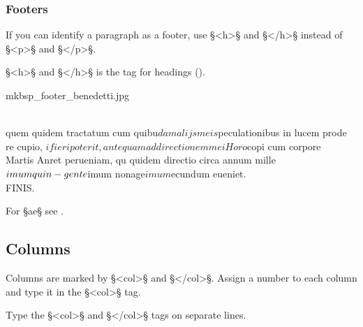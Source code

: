 \subsubsection{Footers}

\begin{mainruleLessImportant}
If you can identify a paragraph as a footer, use §<h>§ and §</h>§ instead of §<p>§ and §</p>§.
\end{mainruleLessImportant}

\begin{crossref}
§<h>§ and §</h>§ is the tag for headings ().
\end{crossref}

\begin{sampleImage}{mkbsp_footer_benedetti.jpg}
\begin{typeLatin}
 \someText \\
quem quidem tractatum cum quibu$dam alijs meis $peculationibus in lucem prode\\
re cupio, $i fieri poterit, antequam ad directionem mei Horo$copi cum corpore\\
Martis Anret perueniam, qu quidem directio circa annum mille$imum quin-\\
gente$imum nonage$imum $ecundum eueniet.\\
FINIS.
\end{typeLatin}

\end{sampleImage}

\begin{crossref}
For §{ae}§ see .
\end{crossref}


\tocspace
\subsection{Columns}
\label{section columns}

\begin{mainrule}
Columns are marked by §<col>§ and §</col>§. Assign a number to each column and type it in the §<col>§ tag.
\end{mainrule}

\begin{clarification}
Type the §<col>§ and §</col>§ tags on separate lines.
\end{clarification}

\mehrzeilen

